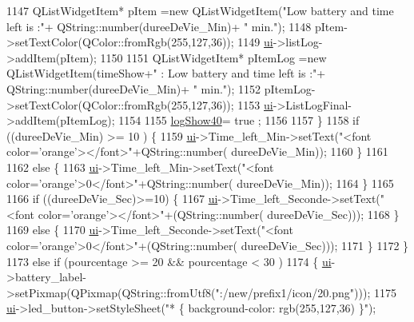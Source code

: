 \begin{DoxyCode}
{1147                   QListWidgetItem* pItem =\textcolor{keyword}{new} QListWidgetItem(\textcolor{stringliteral}{"Low battery and time left is :"}+ 
      QString::number(dureeDeVie\_Min)+ \textcolor{stringliteral}{" min."});
1148                   pItem->setTextColor(QColor::fromRgb(255,127,36));
1149                   \hyperlink{a00008_a6dc041ef6a2ffb329928d2913e8344e6}{ui}->listLog->addItem(pItem);
1150 
1151                   QListWidgetItem* pItemLog =\textcolor{keyword}{new} QListWidgetItem(timeShow+\textcolor{stringliteral}{" : Low battery and time left is
       :"}+ QString::number(dureeDeVie\_Min)+ \textcolor{stringliteral}{" min."});
1152                   pItemLog->setTextColor(QColor::fromRgb(255,127,36));
1153                   \hyperlink{a00008_a6dc041ef6a2ffb329928d2913e8344e6}{ui}->ListLogFinal->addItem(pItemLog);
1154 
1155                   \hyperlink{a00008_a69c10d3146f1a21e3a2291d272872b3e}{logShow40}= true ;
1156 
1157               \}
1158                 \textcolor{keywordflow}{if} ((dureeDeVie\_Min) >=  10 ) \{
1159                     \hyperlink{a00008_a6dc041ef6a2ffb329928d2913e8344e6}{ui}->Time\_left\_Min->setText(\textcolor{stringliteral}{"<font color='orange'></font>"}+QString::number(
      dureeDeVie\_Min));
1160                 \}
1161 
1162                 \textcolor{keywordflow}{else} \{
1163                     \hyperlink{a00008_a6dc041ef6a2ffb329928d2913e8344e6}{ui}->Time\_left\_Min->setText(\textcolor{stringliteral}{"<font color='orange'>0</font>"}+QString::number(
      dureeDeVie\_Min));
1164                 \}
1165 
1166                 \textcolor{keywordflow}{if} ((dureeDeVie\_Sec)>=10) \{
1167                     \hyperlink{a00008_a6dc041ef6a2ffb329928d2913e8344e6}{ui}->Time\_left\_Seconde->setText(\textcolor{stringliteral}{"<font color='orange'></font>"}+(QString::number(
      dureeDeVie\_Sec)));
1168                 \}
1169                 \textcolor{keywordflow}{else} \{
1170                     \hyperlink{a00008_a6dc041ef6a2ffb329928d2913e8344e6}{ui}->Time\_left\_Seconde->setText(\textcolor{stringliteral}{"<font color='orange'>0</font>"}+(QString::number(
      dureeDeVie\_Sec)));
1171                 \}
1172          \}
1173           \textcolor{keywordflow}{else} \textcolor{keywordflow}{if} (pourcentage >= 20 && pourcentage < 30 )
1174           \{   \hyperlink{a00008_a6dc041ef6a2ffb329928d2913e8344e6}{ui}->battery\_label->setPixmap(QPixmap(QString::fromUtf8(\textcolor{stringliteral}{":/new/prefix1/icon/20.png"})));
1175               \hyperlink{a00008_a6dc041ef6a2ffb329928d2913e8344e6}{ui}->led\_button->setStyleSheet(\textcolor{stringliteral}{"* \{ background-color: rgb(255,127,36) \}"});
}
\end{DoxyCode}
